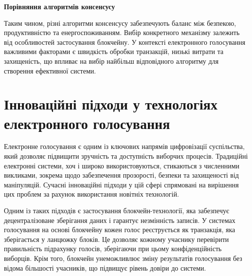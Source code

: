 \documentclass[14pt]{extreport}
\begin{document}
  \begin{table}[H]
  \centering
  \renewcommand{\tablename}{Таблиця}
  \renewcommand{\thetable}{\thechapter.\arabic{table}.}
  \caption{}
  \textbf{Порівняння алгоритмів консенсусу\vspace{5pt}}
  \label{tab:consensus_comparison}
  \end{table}
  
  Таким чином, різні алгоритми консенсусу забезпечують баланс між безпекою, продуктивністю та енергоспоживанням. Вибір конкретного механізму залежить від особливостей застосування блокчейну. У контексті електронного голосування важливими факторами є швидкість обробки транзакцій, низькі витрати та захищеність, що впливає на вибір найбільш відповідного алгоритму для створення ефективної системи.
  
  \section{Інноваційні підходи у технологіях електронного голосування}
  
    Електронне голосування є одним із ключових напрямів цифровізації суспільства, який дозволяє підвищити зручність та доступність виборчих процесів. Традиційні електронні системи, хоч і широко використовуються, стикаються з численними викликами, зокрема щодо забезпечення прозорості, безпеки та захищеності від маніпуляцій. Сучасні інноваційні підходи у цій сфері спрямовані на вирішення цих проблем за рахунок використання новітніх технологій.

  Одним із таких підходів є застосування блокчейн-технології, яка забезпечує децентралізоване зберігання даних і гарантує незмінність записів. У системах голосування на основі блокчейну кожен голос реєструється як транзакція, яка зберігається у ланцюжку блоків. Це дозволяє кожному учаснику перевірити правильність підрахунку голосів, зберігаючи при цьому конфіденційність виборців. Крім того, блокчейн унеможливлює зміну результатів голосування без відома більшості учасників, що підвищує рівень довіри до системи.
\end{document}
